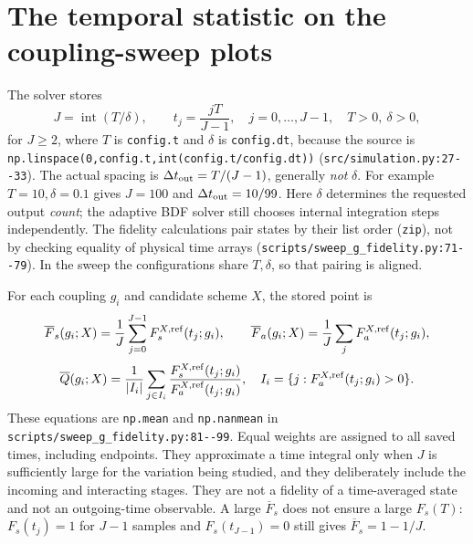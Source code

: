 \documentclass[11pt,a4paper]{article}
\newcommand{\code}[1]{\nolinkurl{#1}}
\begin{document}
\section{The temporal statistic on the coupling-sweep plots}
\label{sec:timeaverage}
The solver stores
\begin{equation}
 J=\operatorname{int}(T/\delta),\qquad
 t_j=\frac{jT}{J-1},\quad j=0,\ldots,J-1,
 \quad T>0,\ \delta>0,
 \label{eq:times}
\end{equation}
for $J\ge2$, where $T$ is \code{config.t} and $\delta$ is \code{config.dt}, because the source is \code{np.linspace(0,config.t,int(config.t/config.dt))} (\code{src/simulation.py:27--33}). The actual spacing is $\Delta t_{\rm out}=T/(J-1)$, generally \emph{not} $\delta$. For example $T=10,\delta=0.1$ gives $J=100$ and $\Delta t_{\rm out}=10/99$. Here $\delta$ determines the requested output \emph{count}; the adaptive BDF solver still chooses internal integration steps independently. The fidelity calculations pair states by their list order (\code{zip}), not by checking equality of physical time arrays (\code{scripts/sweep_g_fidelity.py:71--79}). In the sweep the configurations share $T,\delta$, so that pairing is aligned.

For each coupling $g_i$ and candidate scheme $X$, the stored point is
\begin{equation}
 \overline F_s(g_i;X)=\frac1J\sum_{j=0}^{J-1}F_s^{X,\rm ref}(t_j;g_i),\qquad
 \overline F_a(g_i;X)=\frac1J\sum_jF_a^{X,\rm ref}(t_j;g_i),
 \label{eq:means}\end{equation}
\begin{equation}
 \overline Q(g_i;X)=\frac1{|I_i|}\sum_{j\in I_i}
 \frac{F_s^{X,\rm ref}(t_j;g_i)}{F_a^{X,\rm ref}(t_j;g_i)},
 \quad I_i=\{j:F_a^{X,\rm ref}(t_j;g_i)>0\}.
 \label{eq:qmean}
\end{equation}
These equations are \code{np.mean} and \code{np.nanmean} in \code{scripts/sweep_g_fidelity.py:81--99}. Equal weights are assigned to all saved times, including endpoints. They approximate a time integral only when $J$ is sufficiently large for the variation being studied, and they deliberately include the incoming and interacting stages. They are not a fidelity of a time-averaged state and not an outgoing-time observable. A large $\overline F_s$ does not ensure a large $F_s(T)$: $F_s(t_j)=1$ for $J-1$ samples and $F_s(t_{J-1})=0$ still gives $\overline F_s=1-1/J$.
\end{document}

